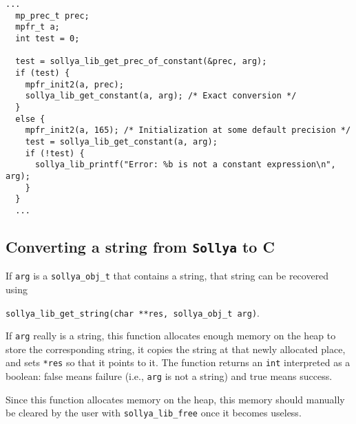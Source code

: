 \documentclass[a4paper]{article}
\newcommand{\sollya}{\texttt{Sollya}\xspace}
\begin{document}
\begin{center}\begin{minipage}{15cm}\begin{Verbatim}[frame=single]
  ...
  mp_prec_t prec;
  mpfr_t a;
  int test = 0;

  test = sollya_lib_get_prec_of_constant(&prec, arg);
  if (test) {
    mpfr_init2(a, prec);
    sollya_lib_get_constant(a, arg); /* Exact conversion */
  }
  else {
    mpfr_init2(a, 165); /* Initialization at some default precision */
    test = sollya_lib_get_constant(a, arg);
    if (!test) {
      sollya_lib_printf("Error: %b is not a constant expression\n", arg);
    }
  }
  ...
\end{Verbatim}
\end{minipage}\end{center}

\subsection{Converting a string from \sollya to C}
If \verb|arg| is a \verb|sollya_obj_t| that contains a string, that string can be recovered using
\begin{center}
\verb|sollya_lib_get_string(char **res, sollya_obj_t arg)|.
\end{center}
If \verb|arg| really is a string, this function allocates enough memory on the heap to store the corresponding string, it copies the string at that newly allocated place, and sets \verb|*res| so that it points to it. The function returns an \verb|int| interpreted as a boolean: false means failure (i.e., \verb|arg| is not a string) and true means success.

Since this function allocates memory on the heap, this memory should manually be cleared by the user with \verb|sollya_lib_free| once it becomes useless.
\end{document}
